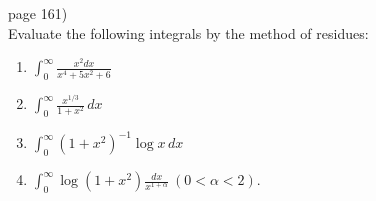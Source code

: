 \documentclass{article}
\newenvironment{problem}[2][Problem]{\begin{trivlist}
\item[\hskip \labelsep {\bfseries #1}\hskip \labelsep {\bfseries #2.}]}{\end{trivlist}}
\begin{document}
\begin{problem}{3} (page 161) \\
  Evaluate the following integrals by the method of residues: \begin{enumerate}
    \item[(b)] $\displaystyle \int_0^\infty \frac{x^2 dx}{x^4 + 5x^2 + 6}$
    \item[(g)] $\displaystyle \int_0^\infty \frac{x^{1/3}}{1+x^2}\,dx$
    \item[(h)] $\displaystyle \int_0^\infty (1+x^2)^{-1}\log x\, dx$
    \item[(i)] $\displaystyle \int_0^\infty \log (1 + x^2) \frac{dx}{x^{1 + \alpha}}\ (0 < \alpha < 2)$.
  \end{enumerate}
\end{problem}
\end{document}

